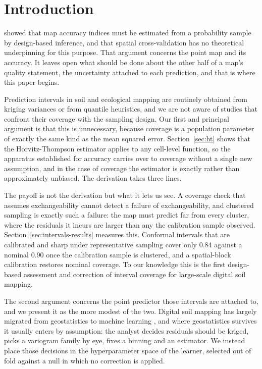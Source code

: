 \documentclass[preprint,12pt,authoryear]{elsarticle}
\begin{document}
\section{Introduction}

\citet{wadoux2021} showed that map accuracy indices must be estimated from a
probability sample by design-based inference, and that spatial cross-validation
has no theoretical underpinning for this purpose. That argument concerns the
point map and its accuracy. It leaves open what should be done about the other
half of a map's quality statement, the uncertainty attached to each prediction,
and that is where this paper begins.

Prediction intervals in soil and ecological mapping are routinely obtained from
kriging variances or from quantile heuristics, and we are not aware of studies
that confront their coverage with the sampling design. Our first and principal
argument is that this is unnecessary, because coverage is a population parameter
of exactly the same kind as the mean squared error. Section~\ref{sec:ht} shows
that the Horvitz-Thompson estimator applies to any cell-level function, so the
apparatus \citet{wadoux2021} established for accuracy carries over to coverage
without a single new assumption, and in the case of coverage the estimator is
exactly rather than approximately unbiased. The derivation takes three lines.

The payoff is not the derivation but what it lets us see. A coverage check that
assumes exchangeability cannot detect a failure of exchangeability, and clustered
sampling is exactly such a failure: the map must predict far from every cluster,
where the residuals it incurs are larger than any the calibration sample
observed. Section~\ref{sec:intervals-results} measures this. Conformal intervals
that are calibrated and sharp under representative sampling cover only 0.84
against a nominal 0.90 once the calibration sample is clustered, and a
spatial-block calibration restores nominal coverage. To our knowledge this is the
first design-based assessment and correction of interval coverage for
large-scale digital soil mapping.

The second argument concerns the point predictor those intervals are attached
to, and we present it as the more modest of the two. Digital soil mapping has
largely migrated from geostatistics to machine learning \citep{mcbratney2003},
and where geostatistics survives it usually enters by assumption: the analyst
decides residuals should be kriged, picks a variogram family by eye, fixes a
binning and an estimator. We instead place those decisions in the hyperparameter
space of the learner, selected out of fold against a null in which no correction
is applied.
\end{document}
